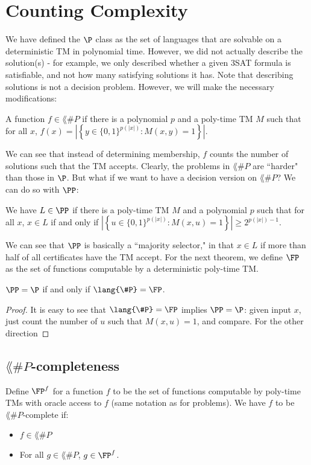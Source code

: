 \section{Counting Complexity}

We have defined the $\P$ class as the set of languages that are solvable on a deterministic TM in polynomial time. However, we did not actually describe the solution(s) - for example, we only described whether a given 3SAT formula is satisfiable, and not how many satisfying solutions it has. Note that describing solutions is not a decision problem. However, we will make the necessary modifications:

\newcommand{\SharpP}{\lang{\#P}}
\begin{definition}
A function $f \in \SharpP$ if there is a polynomial $p$ and a poly-time TM $M$ such that for all $x$, $f(x) = |\left \{y \in \{0, 1\}^{p(|x|)} \colon M(x, y) = 1\right \}|$.
\end{definition}

We can see that instead of determining membership, $f$ counts the number of solutions such that the TM accepts. Clearly, the problems in $\SharpP$ are ``harder" than those in $\P$. But what if we want to have a decision version on $\SharpP$? We can do so with $\PP$:

\begin{definition}
We have $L \in \PP$ if there is a poly-time TM $M$ and a polynomial $p$ such that for all $x$, $x \in L$ if and only if $|\left\{u \in \{0, 1\}^{p(|x|)} \colon M(x, u) = 1\right\} | \ge 2^{p(|x|)-1}$.
\end{definition}
We can see that $\PP$ is basically a ``majority selector," in that $x \in L$ if more than half of all certificates have the TM accept. For the next theorem, we define $\FP$ as the set of functions computable by a deterministic poly-time TM.

\begin{theorem}
$\PP = \P$ if and only if $\SharpP = \FP$. 
\end{theorem}

\begin{proof}
It is easy to see that $\SharpP = \FP$ implies $\PP = \P$: given input $x$, just count the number of $u$ such that $M(x, u) = 1$, and compare. For the other direction
\end{proof}

\subsection{$\SharpP$-completeness}
\begin{definition}
Define $\FP^{f}$ for a function $f$ to be the set of functions computable by poly-time TMs with oracle access to $f$ (same notation as for problems). We have $f$ to be $\SharpP$-complete if:
\begin{itemize}
\item $f \in \SharpP$
\item For all $g \in \SharpP$, $g \in \FP^{f}$.
\end{itemize}
\end{definition}

